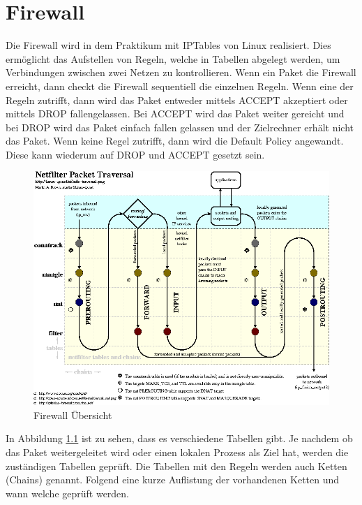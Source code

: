 \chapter{Firewall}\label{fw}
Die Firewall wird in dem Praktikum mit IPTables von Linux realisiert. Dies ermöglicht das Aufstellen von Regeln, welche in Tabellen abgelegt werden, um Verbindungen zwischen zwei Netzen zu kontrollieren. Wenn ein Paket die Firewall erreicht, dann checkt die Firewall sequentiell die einzelnen Regeln. Wenn eine der Regeln zutrifft, dann wird das Paket entweder mittels ACCEPT akzeptiert oder mittels DROP fallengelassen. Bei ACCEPT wird das Paket weiter gereicht und bei DROP wird das Paket einfach fallen gelassen und der Zielrechner erhält nicht das Paket. Wenn keine Regel zutrifft, dann wird die Default Policy angewandt. Diese kann wiederum auf DROP und ACCEPT gesetzt sein. 
\begin{figure}
	\centering
		\includegraphics[width=1.00\textwidth]{figures/firewall_uebersicht.PNG}
	\caption{Firewall Übersicht \cite{linux-ip}}
	\label{fig:firewall_uebersicht}
\end{figure}
In Abbildung \ref{fig:firewall_uebersicht} ist zu sehen, dass es verschiedene Tabellen gibt. Je nachdem ob das Paket weitergeleitet wird oder einen lokalen Prozess als Ziel hat, werden die zuständigen Tabellen geprüft. Die Tabellen mit den Regeln werden auch Ketten (Chains) genannt. Folgend eine kurze Auflistung der vorhandenen Ketten und wann welche geprüft werden.
